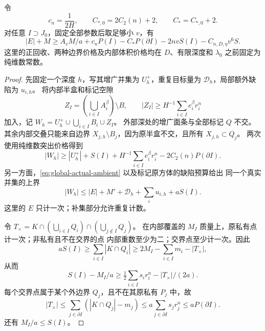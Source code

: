 \begin{lemma}\label{lem:global-interior-recovery}
令
\[
 c_n=\frac1{2H},\qquad C_{*,0}=2C_2(n)+2,\qquad C_*=C_{*,0}+2.
\]
对任意 \(I\supset J_0\)，固定全部参数后取足够小 \(v\)，有
\begin{equation}\label{eq:global-recovery-interface}
 |E|+M\ge A_vM/a+c_nP(I)-C_*P(\partial I)
                  -2nvS(I)-C_{n,D,\eta}v^6S.
\end{equation}
这里的正回收、两种边界价格及内部体积价格均在 \(D\)、有限深度和
\(\lambda_0\) 之前固定为纯维数常数。
\end{lemma}
\begin{proof}
先固定一个深度 \(h\)，写其增广并集为 \(U_h^+\)，重复目标量为
\(\mathcal D_h\)，局部额外缺陷为 \(u_{i,h}\)。
将内部半盒和标记空隙
\[
 Z_I=\left(\bigcup_{i\in I}A_i^\beta\right)\setminus B,\qquad
 |Z_I|\ge H^{-1}\sum_{i\in I}e_i^\beta r_i^n
\]
加入，记 \(W_h=U_h^+\cup\bigcup_{i\in I}B_i\cup Z_I\)。
外部深处的增广面条与全部标记 \(Q\) 不交。其余内部交叠只能来自边界
\(X_{j,h}\setminus B_j\)，因为原半盒不交，且所有 \(X_{j,h}\subset Q_j\)。
两次使用纯维数突出价格得到
\begin{equation}\label{eq:global-recovered-union}
 |W_h|\ge |U_h^+|+S(I)+H^{-1}\sum_{i\in I}e_i^\beta r_i^n
                         -2C_2(n)P(\partial I).
\end{equation}
另一方面，\eqref{eq:global-actual-ambient} 以及标记原方体的缺陷预算给出
同一个真实并集的上界
\begin{equation}\label{eq:global-exact-ambient-upper}
 |W_h|\le |E|+M'+\mathcal D_h+\sum_i u_{i,h}+aS(I).
\end{equation}
这里的 \(E\) 只计一次；补集部分允许重复计数。

令
\(T_\times=K\cap(\bigcup_{i\in I}Q_i)\cap(\bigcup_{j\notin I}Q_j)\)。
在内部覆盖的 \(M_I\) 质量上，原私有点计一次；非私有且不在交界的点
内部重数至少为二；交界点至少计一次。因此
\[
 aS(I)\ge\sum_{i\in I}|K\cap Q_i|
 \ge2M_I-\sum_{i\in I}m_i-|T_\times|,
\]
从而
\begin{equation}\label{eq:global-interior-capacity}
 S(I)-M_I/a\ge\tfrac12\sum_{i\in I}s_ir_i^n-|T_\times|/(2a).
\end{equation}
每个交界点属于某个外边界 \(Q_j\)，且不在其原私有 \(P_j\) 中，故
\begin{equation}\label{eq:global-cross-boundary-mass}
 |T_\times|\le\sum_{j\in\partial I}(|K\cap Q_j|-m_j)
 \le a\sum_{j\in\partial I}s_jr_j^n\le aP(\partial I).
\end{equation}
还有 \(M_I/a\le S(I)\)。


\end{proof}
